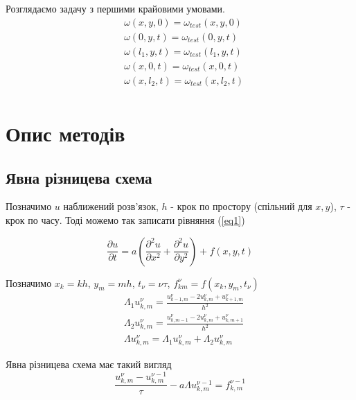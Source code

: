 \documentclass[a4paper,12pt]{article}
\begin{document}
Розглядаємо задачу з першими крайовими умовами.
\begin{equation} \label{eq3}
	\begin{aligned}
		&\omega(x,y,0) = \omega_{test}(x,y,0)	\\
		&\omega(0,y,t) = \omega_{test}(0,y,t)	\\
		&\omega(l_1,y,t) = \omega_{test}(l_1,y,t)	\\
		&\omega(x,0,t) = \omega_{test}(x,0,t)	\\
		&\omega(x,l_2,t) = \omega_{test}(x,l_2,t)	\\
	\end{aligned}
\end{equation}

\section{Опис методів}

\subsection{Явна різницева схема}

Позначимо $u$ наближений розв'язок, $h$ - крок по простору (спільний для $x,y$), $\tau$ - крок по часу. Тоді можемо так записати рівняння (\ref{eq1})

\begin{equation} \label{eq4}
	\frac{\partial u}{\partial t} = a \left( \frac{\partial^2 u}{\partial x^2} + \frac{\partial^2 u}{\partial y^2}\right) + f(x,y,t)
\end{equation}

Позначимо $x_k = kh$, $y_m = mh$, $t_\nu = \nu \tau$, $f_{km}^{\nu} = f(x_k, y_m, t_{\nu})$
\begin{equation}
	\begin{aligned}
		&\Lambda_1 u_{k,m}^{\nu}= \frac{ u_{k-1,m}^{\nu} - 2 u_{k,m}^{\nu} + u_{k+1, m}^{\nu} }{h^2} \\
		&\Lambda_2 u_{k,m}^{\nu} = \frac{ u_{k,m-1}^{\nu} - 2 u_{k,m}^{\nu} + u_{k, m+1}^{\nu} }{h^2} \\ 
		&\Lambda u_{k,m}^{\nu} = \Lambda_1 u_{k,m}^{\nu} + \Lambda_2 u_{k,m}^{\nu}
	\end{aligned} \nonumber
\end{equation}

Явна різницева схема має такий вигляд
\begin{equation} \label{eq5}
	\frac{u_{k,m}^{\nu} - u_{k,m}^{\nu -1}}{\tau} - a\Lambda u_{k,m}^{\nu-1} = f_{k,m}^{\nu-1}
\end{equation}
\end{document}
